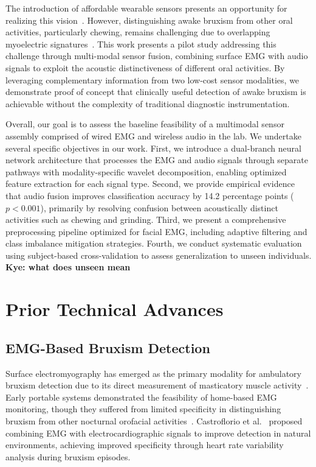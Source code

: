 \documentclass[acmtog, nonacm]{acmart}
\begin{document}
The introduction of affordable wearable sensors presents an opportunity for realizing this vision~\cite{gul2024advanced}. However, distinguishing awake bruxism from other oral activities, particularly chewing, remains challenging due to overlapping myoelectric signatures~\cite{stuginski2016detection}. This work presents a pilot study addressing this challenge through multi-modal sensor fusion, combining surface EMG with audio signals to exploit the acoustic distinctiveness of different oral activities. By leveraging complementary information from two low-cost sensor modalities, we demonstrate proof of concept that clinically useful detection of awake bruxism is achievable without the complexity of traditional diagnostic instrumentation.


 Overall, our goal is to assess the baseline feasibility of a multimodal sensor assembly comprised of wired EMG and wireless audio in the lab. We undertake several specific objectives in our work. First, we introduce a dual-branch neural network architecture that processes the EMG and audio signals through separate pathways with modality-specific wavelet decomposition, enabling optimized feature extraction for each signal type. Second, we provide empirical evidence that audio fusion improves classification accuracy by 14.2 percentage points ($p < 0.001$), primarily by resolving confusion between acoustically distinct activities such as chewing and grinding. Third, we present a comprehensive preprocessing pipeline optimized for facial EMG, including adaptive filtering and class imbalance mitigation strategies. Fourth, we conduct systematic evaluation using subject-based cross-validation to assess generalization to unseen individuals. \textbf{Kye: what does unseen mean}

 \section{Prior Technical Advances}

\subsection{EMG-Based Bruxism Detection}

Surface electromyography has emerged as the primary modality for ambulatory bruxism detection due to its direct measurement of masticatory muscle activity~\cite{raez2006techniques}. Early portable systems demonstrated the feasibility of home-based EMG monitoring, though they suffered from limited specificity in distinguishing bruxism from other nocturnal orofacial activities~\cite{stuginski2016detection}. Castroflorio et al.~\cite{castroflorio2013use} proposed combining EMG with electrocardiographic signals to improve detection in natural environments, achieving improved specificity through heart rate variability analysis during bruxism episodes.
\end{document}
